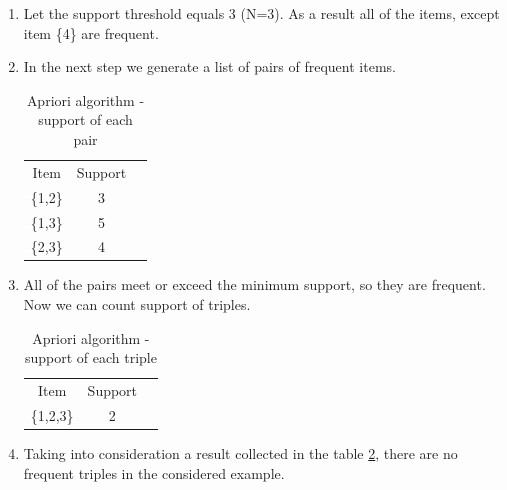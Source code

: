 \begin{enumerate}
\begin{table}[H]
\begin{tabular}{|c|c|l}
		\end{tabular}
	\end{table}
	\item Let the support threshold equals 3 (N=3). As a result all of the items, except item \{4\} are frequent. 
	\item In the next step we generate a list of pairs of frequent items.
	\begin{table}[H]
		\centering
		\caption{Apriori algorithm - support of each pair}
		\label{apriori-3}
		\begin{tabular}{|c|c|l}
			\cline{1-2}
			Item    & Support &  \\ \cline{1-2}
			\{1,2\} & 3       &  \\ \cline{1-2}
			\{1,3\} & 5       &  \\ \cline{1-2}
			\{2,3\} & 4       &  \\ \cline{1-2}
		\end{tabular}
	\end{table}
	\item All of the pairs meet or exceed the minimum support, so they are frequent. Now we can count support of triples. 
	\begin{table}[H]
		\centering
		\caption{Apriori algorithm - support of each triple}
		\label{apriori-4}
		\begin{tabular}{|c|c|l}
			\cline{1-2}
			Item      & Support &  \\ \cline{1-2}
			\{1,2,3\} & 2       &  \\ \cline{1-2}
		\end{tabular}
	\end{table}
	\item Taking into consideration a result collected in the table \ref{apriori-4}, there are no frequent triples in the considered example.
\end{enumerate}
